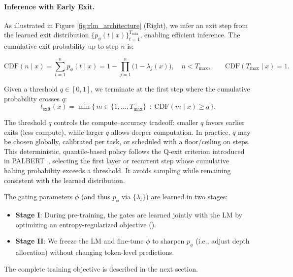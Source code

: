 \documentclass[]{bytedance_seed}
\newcommand{\1}{\mathbf{1}}
\begin{document}




\paragraph{Inference with Early Exit.}
As illustrated in Figure \ref{fig:rlm_architecture} (Right), we infer an exit step from the learned exit distribution $\{p_\phi(t\mid x)\}_{t=1}^{T_{\max}}$, enabling efficient inference. The cumulative exit probability up to step $n$ is:

$$
\mathrm{CDF}(n\mid x) = \sum_{t=1}^{n} p_\phi(t\mid x)
= 1 - \prod_{j=1}^{n}\bigl(1-\lambda_j(x)\bigr), \quad
n<T_{\max},\qquad \mathrm{CDF}(T_{\max}\mid x)=1.
$$

Given a threshold $q \in [0,1]$, we terminate at the first step where the cumulative probability crosses $q$:
$$
t_{\mathrm{exit}}(x) = \min\{\,m \in \{1,\dots,T_{\max}\}\,\;:\; \mathrm{CDF}(m\mid x) \ge q\, \}.
$$

The threshold $q$ controls the compute–accuracy tradeoff: smaller $q$ favors earlier exits (less compute), while larger $q$ allows deeper computation. In practice, $q$ may be chosen globally, calibrated per task, or scheduled with a floor/ceiling on steps. This deterministic, quantile-based policy follows the Q-exit criterion introduced in PALBERT~\cite{balagansky2022palbert}, selecting the first layer or recurrent step whose cumulative halting probability exceeds a threshold. It avoids sampling while remaining consistent with the learned distribution. 

The gating parameters $\phi$ (and thus $p_\phi$ via $\{\lambda_t\}$) are learned in  two stages:
\begin{itemize}
    \item \textbf{Stage I}: During pre-training, the gates are learned jointly with the LM by optimizing an entropy-regularized objective ().
    \item \textbf{Stage II}: We freeze the LM and fine-tune $\phi$ to sharpen $p_\phi$ (i.e., adjust depth allocation) without changing token-level predictions.
\end{itemize}

The complete training objective is described in the next section.
\end{document}

